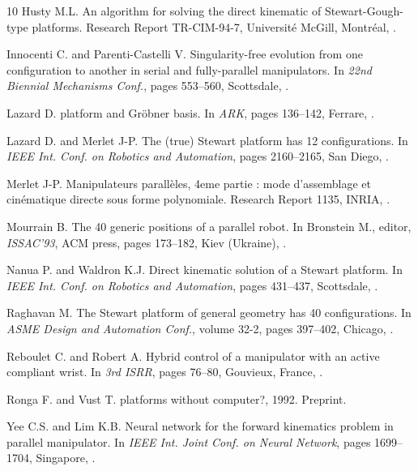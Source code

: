 \begin{thebibliography}{10}
Husty M.L.
\newblock An algorithm for solving the direct kinematic of
  {Stewart}-{Gough}-type platforms.
\newblock Research Report TR-CIM-94-7, Universit\'e McGill, Montr\'eal,
  .

Innocenti C. and Parenti-Castelli V.
\newblock Singularity-free evolution from one configuration to another in
  serial and fully-parallel manipulators.
\newblock In {\em 22nd Biennial Mechanisms Conf.}, pages 553--560, Scottsdale,
  .

Lazard D.
 platform and {Gr\"obner} basis.
\newblock In {\em ARK}, pages 136--142, Ferrare,
  .

Lazard D. and Merlet J-P.
\newblock The (true) {Stewart} platform has 12 configurations.
\newblock In {\em IEEE Int. Conf. on Robotics and Automation}, pages
  2160--2165, San Diego, .

Merlet J-P.
\newblock Manipulateurs parall\`eles, 4eme partie : mode d'assemblage et
  cin\'ematique directe sous forme polynomiale.
\newblock Research Report 1135, INRIA, .


Mourrain B.
\newblock The 40 generic positions of a parallel robot.
\newblock In Bronstein M., editor, {\em ISSAC'93}, ACM press, pages 173--182,
  Kiev (Ukraine), .

Nanua P. and Waldron K.J.
\newblock Direct kinematic solution of a {Stewart} platform.
\newblock In {\em IEEE Int. Conf. on Robotics and Automation}, pages 431--437,
  Scottsdale, .

Raghavan M.
\newblock The {Stewart} platform of general geometry has 40 configurations.
\newblock In {\em ASME Design and Automation Conf.}, volume 32-2, pages
  397--402, Chicago, .

Reboulet C. and Robert A.
\newblock Hybrid control of a manipulator with an active compliant wrist.
\newblock In {\em 3rd ISRR}, pages 76--80, Gouvieux, France,
  .

Ronga F. and Vust T.
 platforms without computer?, 1992.
\newblock Preprint.

Yee C.S. and Lim K.B.
\newblock Neural network for the forward kinematics problem in parallel
  manipulator.
\newblock In {\em IEEE Int. Joint Conf. on Neural Network}, pages 1699--1704,
  Singapore, .

\end{thebibliography}

 
